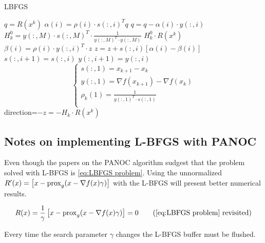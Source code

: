 		\begin{algorithm}
			\caption{LBFGS}
			\label{alg:LBFGS}
			\begin{algorithmic}[1]
				\State $q = R(x^k)$
				\State $\alpha(i)=\rho(i) \cdot s(:,i)^Tq$
				\State $q = q - \alpha(i) \cdot y(:,i)$
				\EndFor
				\State $H_k^0 = y(:,M) \cdot s(:,M)^T \cdot  \frac{1}{y(:,M)^T \cdot y(:,M)}$
				\State $H^0_k \cdot R(x^k)$
				\State $\beta(i) = \rho(i) \cdot y(:,i)^T \cdot z$
				\State $z = z + s(:,i)[\alpha(i)-\beta(i)]$
				\EndFor
				\State $s(:,i+1)=s(:,i)$
				\State $y(:,i+1)=y(:,i)$
				\EndFor
				\State $$\begin{cases}
				s(:,1) = x_{k+1} - x_k \\
				y(:,1) = \nabla f(x_{k+1}) - \nabla f(x_k)\\
				\rho_k(1) = \frac{1}{y(:,1)^T \cdot s(:,1)} \\ 
				\end{cases}
				$$
				\State \Return direction=$-z=-H_k \cdot R(x^k)$
				\EndProcedure
			\end{algorithmic}
		\end{algorithm}
	
	\subsection{Notes on implementing L-BFGS with PANOC}
	Even though the papers on the PANOC algorithm sudgest that the problem solved with L-BFGS is \eqref{eq:LBFGS problem}. Using the unnormalized $R'(x) = \left[ x - \operatorname{prox}_g( x - \nabla f(x)\gamma) \right]$ with the L-BFGS will present better numerical results.
	
	\begin{equation}
	R(x) = \frac{1}{\gamma}\left[ x - \prox_g( x - \nabla f(x)\gamma) \right] = 0
	\tag{\eqref{eq:LBFGS problem} revisited}
	\end{equation}
	
	Every time the search parameter $\gamma$ changes the L-BFGS buffer must be flushed.
